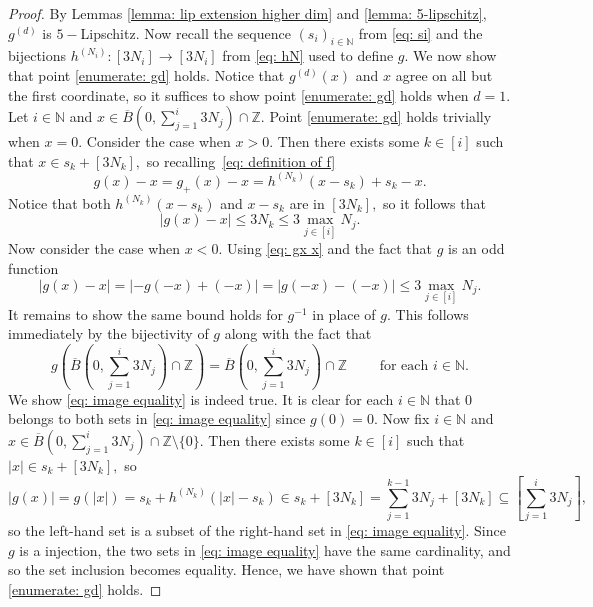 \documentclass{article}
\newcommand{\Z}{\mathbb{Z}}
\newcommand{\N}{\mathbb{N}}
\begin{document}
\begin{proof} By Lemmas \ref{lemma: lip extension higher dim} and \ref{lemma: 5-lipschitz}, $g^{(d)}$ is $5-$Lipschitz. Now recall the sequence $(s_i)_{i \in \N}$ from \eqref{eq: si} and the bijections $h^{(N_i)}:[3N_i] \to [3N_i]$ from \eqref{eq: hN} used to define $g.$ We now show that point \ref{enumerate: gd} holds. Notice that $g^{(d)}(x)$ and $x$ agree on all but the first coordinate, so it suffices to show point \ref{enumerate: gd} holds when $d=1.$ Let $i \in \N$ and $x \in \overline{B}(0,\sum_{j=1}^i 3N_j) \cap \Z.$ Point \ref{enumerate: gd} holds trivially when $x=0$. Consider the case when $x>0$. Then there exists some $k \in [i]$ such that $x \in s_k+[3N_k],$ so recalling~\eqref{eq: definition of f}
$$g(x)-x =g_+(x)-x = h^{(N_k)}(x-s_k)+s_k-x.$$
Notice that both $h^{(N_k)}(x-s_k)$ and $x-s_k$ are in $[3N_k],$ so it follows that
\begin{equation}\label{eq: gx x}
    |g(x)-x| \leq 3N_k\leq 3\max_{j \in [i]}N_j.
\end{equation}
Now consider the case when $x<0.$ Using \eqref{eq: gx x} and the fact that $g$ is an odd function 
$$|g(x)-x| = |-g(-x)+(-x)| = |g(-x)-(-x)| \leq 3\max_{j \in [i]} N_j.$$
It remains to show the same bound holds for $g^{-1}$ in place of $g.$ This follows immediately by the bijectivity of $g$ along with the fact that 
\begin{equation} \label{eq: image equality}
g\left({\overline{B}\left(0,\sum_{j=1}^i 3N_j\right)\cap\Z}\right) = \overline{B}\left(0,\sum_{j=1}^i 3N_j\right)\cap\Z\qquad  \text{ for each }i \in \N.
\end{equation}
We show \eqref{eq: image equality} is indeed true. It is clear for each $i \in \N$ that $0$ belongs to both sets in \eqref{eq: image equality} since $g(0) = 0$. Now fix $i \in \N$ and $x \in \overline{B}\left(0,\sum_{j=1}^i 3N_j\right)\cap\Z\setminus \{0\}.$ Then there exists some $k \in [i]$ such that $|x| \in s_k+[3N_k],$ so
$$|g(x)|=g(|x|) = s_k+h^{(N_k)}(|x|-s_k) \in s_k+ [3N_k] = \sum_{j=1}^{k-1}3N_j+[3N_k] \subseteq \left[\sum_{j=1}^i 3N_j \right],$$ so the left-hand set is a subset of the right-hand set in \eqref{eq: image equality}. Since $g$ is a injection, the two sets in \eqref{eq: image equality} have the same cardinality, and so the set inclusion becomes equality. Hence, we have shown that point \ref{enumerate: gd} holds.


\end{proof}
\end{document}
